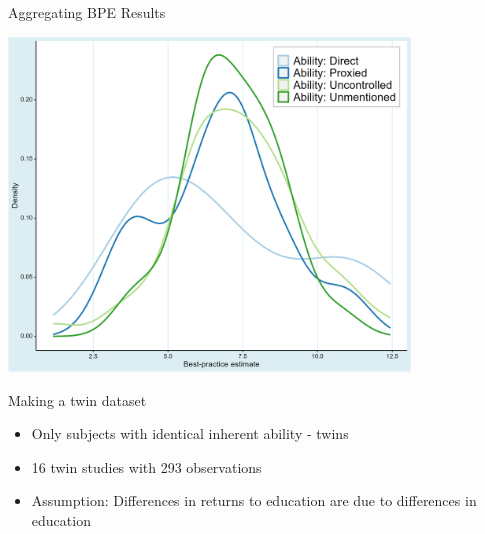 \documentclass{beamer} %
\begin{document}
\begin{frame}{Aggregating BPE Results}
    \begin{center}
        \includegraphics[width=0.8\textwidth]{Figures/bpe_ability.png}
    \end{center}
\end{frame}



\begin{frame}{Making a twin dataset}

    \begin{itemize}
        \item Only subjects with identical inherent ability - twins
        \item 16 twin studies with 293 observations
        \item Assumption: Differences in returns to education are due to differences in education
    \end{itemize}

\end{frame}
\end{document}
